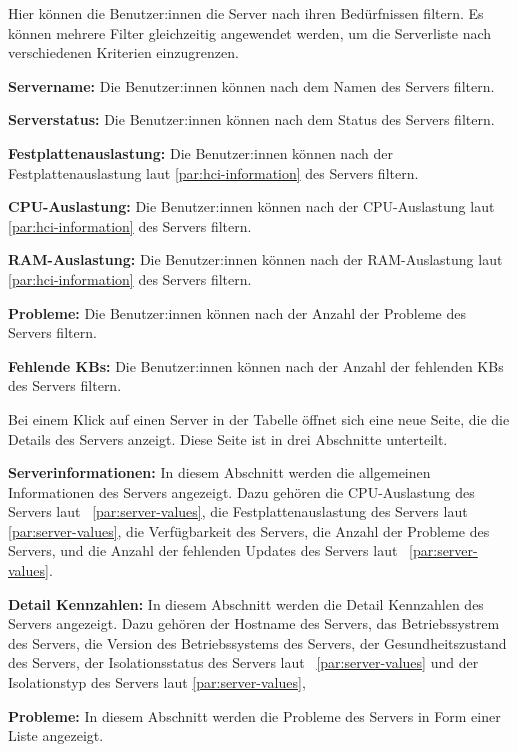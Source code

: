 \begin{compactitem}
\begin{compactitem}
\begin{compactitem}
\begin{compactitem}
                Hier können die Benutzer:innen die Server nach ihren Bedürfnissen filtern.
                Es können mehrere Filter gleichzeitig angewendet werden, um die Serverliste nach verschiedenen Kriterien einzugrenzen.
                \begin{compactitem}
                    \item \textbf{Servername:} Die Benutzer:innen können nach dem Namen des Servers filtern.
                    \item \textbf{Serverstatus:} Die Benutzer:innen können nach dem Status des Servers filtern.
                    \item \textbf{Festplattenauslastung:} Die Benutzer:innen können nach der Festplattenauslastung laut \ref{par:hci-information} des Servers filtern.
                    \item \textbf{CPU-Auslastung:} Die Benutzer:innen können nach der CPU-Auslastung laut \ref{par:hci-information} des Servers filtern.
                    \item \textbf{RAM-Auslastung:} Die Benutzer:innen können nach der RAM-Auslastung laut \ref{par:hci-information} des Servers filtern.
                    \item \textbf{Probleme:} Die Benutzer:innen können nach der Anzahl der Probleme des Servers filtern.
                    \item \textbf{Fehlende KBs:} Die Benutzer:innen können nach der Anzahl der fehlenden KBs des Servers filtern.
                \end{compactitem}

                Bei einem Klick auf einen Server in der Tabelle öffnet sich eine neue Seite, die die Details des Servers anzeigt.
                Diese Seite ist in drei Abschnitte unterteilt.
                \begin{compactitem}
                    \item \textbf{Serverinformationen:} In diesem Abschnitt werden die allgemeinen Informationen des Servers angezeigt.
                    Dazu gehören die CPU-Auslastung des Servers laut ~\ref{par:server-values}, die Festplattenauslastung des Servers laut \ref{par:server-values}, die Verfügbarkeit des Servers, die Anzahl der Probleme des Servers, 
                    und die Anzahl der fehlenden Updates des Servers laut ~\ref{par:server-values}.
                    \item \textbf{Detail Kennzahlen:} In diesem Abschnitt werden die Detail Kennzahlen des Servers angezeigt.
                    Dazu gehören der Hostname des Servers, das Betriebssystrem des Servers, die Version des Betriebssystems des Servers,
                    der Gesundheitszustand des Servers, der Isolationsstatus des Servers laut ~\ref{par:server-values} und der Isolationstyp des Servers laut \ref{par:server-values},
                    \item \textbf{Probleme:} In diesem Abschnitt werden die Probleme des Servers in Form einer Liste angezeigt. 
                    

\end{compactitem}
\end{compactitem}
\end{compactitem}
\end{compactitem}
\end{compactitem}
